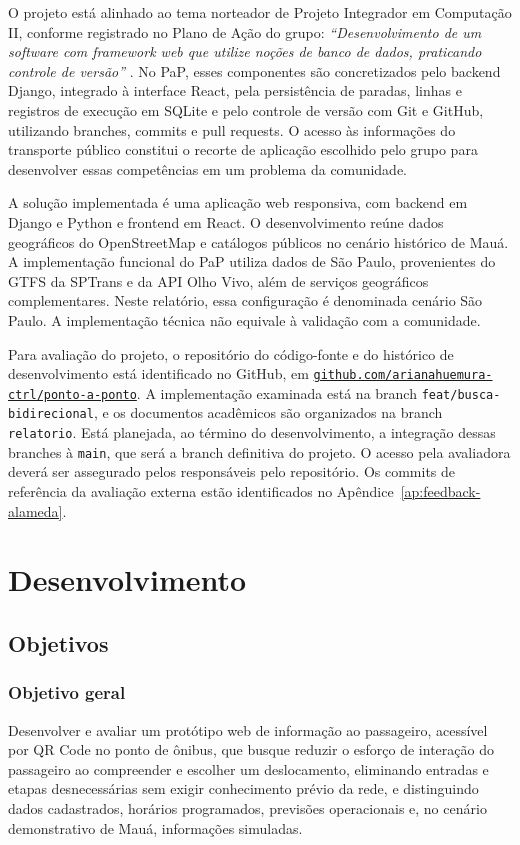 \documentclass[12pt,oneside,a4paper,brazil,chapter=TITLE]{abntex2}
\let\papsection\section
\renewcommand{\section}{\clearpage\papsection}
\let\papsubsection\subsection
\renewcommand{\subsection}{\clearpage\papsubsection}
\begin{document}
O projeto está alinhado ao tema norteador de Projeto Integrador em Computação II, conforme registrado no Plano de Ação do grupo: \textit{``Desenvolvimento de um software com framework web que utilize noções de banco de dados, praticando controle de versão''} \citep[p.~1]{planoacao2026}. No PaP, esses componentes são concretizados pelo backend Django, integrado à interface React, pela persistência de paradas, linhas e registros de execução em SQLite e pelo controle de versão com Git e GitHub, utilizando branches, commits e pull requests. O acesso às informações do transporte público constitui o recorte de aplicação escolhido pelo grupo para desenvolver essas competências em um problema da comunidade.

A solução implementada é uma aplicação web responsiva, com backend em Django e Python e frontend em React. O desenvolvimento reúne dados geográficos do OpenStreetMap e catálogos públicos no cenário histórico de Mauá. A implementação funcional do PaP utiliza dados de São Paulo, provenientes do GTFS da SPTrans e da API Olho Vivo, além de serviços geográficos complementares. Neste relatório, essa configuração é denominada cenário São Paulo. A implementação técnica não equivale à validação com a comunidade.

Para avaliação do projeto, o repositório do código-fonte e do histórico de desenvolvimento está identificado no GitHub, em \href{https://github.com/arianahuemura-ctrl/ponto-a-ponto}{\mbox{\texttt{github.com/arianahuemura-ctrl/ponto-a-ponto}}}. A implementação examinada está na branch \nolinkurl{feat/busca-bidirecional}, e os documentos acadêmicos são organizados na branch \texttt{relatorio}. Está planejada, ao término do desenvolvimento, a integração dessas branches à \texttt{main}, que será a branch definitiva do projeto. O acesso pela avaliadora deverá ser assegurado pelos responsáveis pelo repositório. Os commits de referência da avaliação externa estão identificados no Apêndice~\ref{ap:feedback-alameda}.

\chapter{Desenvolvimento}
\papsection{Objetivos}
\papsubsection*{Objetivo geral}
Desenvolver e avaliar um protótipo web de informação ao passageiro, acessível por QR Code no ponto de ônibus, que busque reduzir o esforço de interação do passageiro ao compreender e escolher um deslocamento, eliminando entradas e etapas desnecessárias sem exigir conhecimento prévio da rede, e distinguindo dados cadastrados, horários programados, previsões operacionais e, no cenário demonstrativo de Mauá, informações simuladas.
\end{document}
